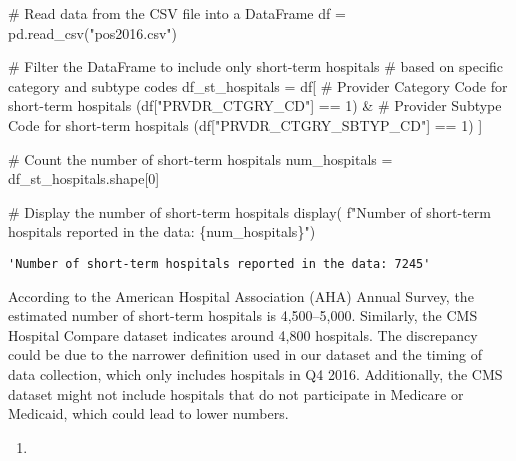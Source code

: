 \documentclass[
  letterpaper,
  DIV=11,
  numbers=noendperiod]{scrartcl}
\newenvironment{Shaded}{\begin{snugshade}}{\end{snugshade}}
\newcommand{\CommentTok}[1]{\textcolor[rgb]{0.37,0.37,0.37}{#1}}
\newcommand{\DecValTok}[1]{\textcolor[rgb]{0.68,0.00,0.00}{#1}}
\newcommand{\NormalTok}[1]{\textcolor[rgb]{0.00,0.23,0.31}{#1}}
\newcommand{\OperatorTok}[1]{\textcolor[rgb]{0.37,0.37,0.37}{#1}}
\newcommand{\SpecialCharTok}[1]{\textcolor[rgb]{0.37,0.37,0.37}{#1}}
\newcommand{\SpecialStringTok}[1]{\textcolor[rgb]{0.13,0.47,0.30}{#1}}
\newcommand{\StringTok}[1]{\textcolor[rgb]{0.13,0.47,0.30}{#1}}
\providecommand{\tightlist}{%
  \setlength{\itemsep}{0pt}\setlength{\parskip}{0pt}}\usepackage{longtable,booktabs,array}
\begin{document}
\begin{Shaded}
\begin{Highlighting}[]
\CommentTok{\# Read data from the CSV file into a DataFrame}
\NormalTok{df }\OperatorTok{=}\NormalTok{ pd.read\_csv(}\StringTok{"pos2016.csv"}\NormalTok{)}

\CommentTok{\# Filter the DataFrame to include only short{-}term hospitals}
\CommentTok{\# based on specific category and subtype codes}
\NormalTok{df\_st\_hospitals }\OperatorTok{=}\NormalTok{ df[}
    \CommentTok{\# Provider Category Code for short{-}term hospitals}
\NormalTok{    (df[}\StringTok{"PRVDR\_CTGRY\_CD"}\NormalTok{] }\OperatorTok{==} \DecValTok{1}\NormalTok{) }\OperatorTok{\&}
    \CommentTok{\# Provider Subtype Code for short{-}term hospitals}
\NormalTok{    (df[}\StringTok{"PRVDR\_CTGRY\_SBTYP\_CD"}\NormalTok{] }\OperatorTok{==} \DecValTok{1}\NormalTok{)}
\NormalTok{]}

\CommentTok{\# Count the number of short{-}term hospitals}
\NormalTok{num\_hospitals }\OperatorTok{=}\NormalTok{ df\_st\_hospitals.shape[}\DecValTok{0}\NormalTok{]}

\CommentTok{\# Display the number of short{-}term hospitals}
\NormalTok{display(}
    \SpecialStringTok{f"Number of short{-}term hospitals reported in the data: }\SpecialCharTok{\{}\NormalTok{num\_hospitals}\SpecialCharTok{\}}\SpecialStringTok{"}\NormalTok{)}
\end{Highlighting}
\end{Shaded}

\begin{verbatim}
'Number of short-term hospitals reported in the data: 7245'
\end{verbatim}

According to the American Hospital Association (AHA) Annual Survey, the
estimated number of short-term hospitals is 4,500--5,000. Similarly, the
CMS Hospital Compare dataset indicates around 4,800 hospitals. The
discrepancy could be due to the narrower definition used in our dataset
and the timing of data collection, which only includes hospitals in Q4
2016. Additionally, the CMS dataset might not include hospitals that do
not participate in Medicare or Medicaid, which could lead to lower
numbers.

\begin{enumerate}
\def\labelenumi{\arabic{enumi}.}
\setcounter{enumi}{2}
\tightlist
\item
\end{enumerate}
\end{document}
